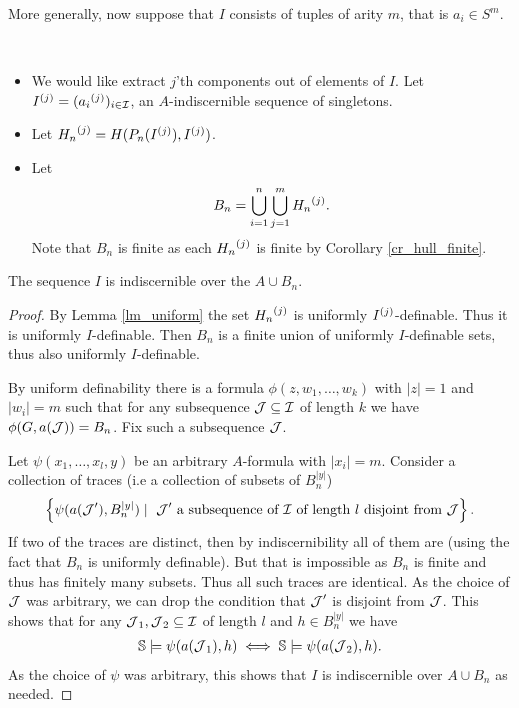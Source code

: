 More generally, now suppose that $I$ consists of tuples of arity $m$, that is $a_i \in S^m$.

\begin{Definition} \ 
  \begin{itemize}
  \item We would like extract $j$'th components out of elements of $I$.
    Let ${I}^{(j)} = ({a_i}^{(j)})_{i \in \operatorname{\mathcal I}}$, an $A$-indiscernible sequence of singletons.
  \item Let ${H_n}^{(j)} = H(P_n({I}^{(j)}), {I}^{(j)})$.
  \item Let
    \begin{align*}
      B_n = \bigcup_{i = 1}^{n} \bigcup_{j = 1}^{m} {H_n}^{(j)}.
    \end{align*}
    Note that $B_n$ is finite as each ${H_n}^{(j)}$ is finite by Corollary \ref{cr_hull_finite}.
  \end{itemize}
\end{Definition}

\begin{Lemma} \label{cr_bump}
  The sequence $I$ is indiscernible over the $A \cup B_n$.
\end{Lemma}

\begin{proof}
  By Lemma \ref{lm_uniform} the set ${H_n}^{(j)}$ is uniformly ${I}^{(j)}$-definable.
  Thus it is uniformly $I$-definable.
  Then $B_n$ is a finite union of uniformly $I$-definable sets, thus also uniformly $I$-definable.

  By uniform definability there is a formula $\phi(z, w_1, \ldots , w_k)$ with $|z| = 1$ and $|w_i| = m$ such that
  for any subsequence $\operatorname{\mathcal J} \subseteq \operatorname{\mathcal I}$ of length $k$ we have $\phi(G, a(\operatorname{\mathcal J})) = B_n$.
  Fix such a subsequence $\operatorname{\mathcal J}$.

  Let $\psi(x_1, \ldots, x_l ,y)$ be an arbitrary $A$-formula with $|x_i| = m$. 
  Consider a collection of traces (i.e a collection of subsets of $B_n^{|y|}$)
  \begin{align*}
    \left\{\psi(a(\operatorname{\mathcal J}'), B_n^{|y|}) \mid \text{ $\operatorname{\mathcal J}'$ a subsequence of $\operatorname{\mathcal I}$ of length $l$ disjoint from $\operatorname{\mathcal J}$}\right\}.
  \end{align*}
  If two of the traces are distinct, then by indiscernibility all of them are (using the fact that $B_n$ is uniformly definable).
  But that is impossible as $B_n$ is finite and thus has finitely many subsets.
  Thus all such traces are identical.
  As the choice of $\operatorname{\mathcal J}$ was arbitrary, we can drop the condition that $\operatorname{\mathcal J}'$ is disjoint from $\operatorname{\mathcal J}$.
  This shows that for any $\operatorname{\mathcal J}_1, \operatorname{\mathcal J}_2 \subseteq \operatorname{\mathcal I}$ of length $l$ and $h \in B_n^{|y|}$ we have
  \begin{align*}
    \mathbb S \models \psi(a(\operatorname{\mathcal J}_1), h) \iff \mathbb S \models \psi(a(\operatorname{\mathcal J}_2), h)    .
  \end{align*}
  As the choice of $\psi$ was arbitrary, this shows that $I$ is indiscernible over $A \cup B_n$ as needed.
\end{proof}

